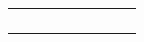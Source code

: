 \documentclass[10pt]{beamer}
\begin{document}
\begin{frame}

\renewcommand{\arraystretch}{0.8}
\begin{tabular}{|p{0.8cm}p{0.8cm}|p{0.8cm}p{0.8cm}|p{0.8cm}p{0.8cm}|p{0.8cm}p{0.8cm}|}
    \hline
       &   \multicolumn{1}{p{0.8cm}}{ }  &     &  \multicolumn{1}{p{0.8cm}}{ }  &   \multicolumn{1}{p{0.8cm}}{ }  &   \multicolumn{1}{p{0.8cm}}{ }   & & \\[0.8cm]
    \cline{2-2} \cline{4-4} \cline{6-6} \cline{8-8}
        &  & & & & & & \\[0.8cm]
    \cline{2-4} \cline{6-8}
       &   \multicolumn{1}{p{0.8cm}}{ }  &  \multicolumn{1}{p{0.8cm}}{ }   &   &   \multicolumn{1}{p{0.8cm}}{ }  &  \multicolumn{1}{p{0.8cm}}{ }   & &\\[0.8cm]
    \cline{2-2} \cline{4-4} \cline{6-6} \cline{8-8}
        &  & & & & & &\\[0.8cm]
    \hline
\end{tabular}
\end{frame}
\end{document}
